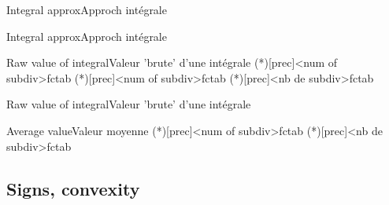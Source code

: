 \documentclass[a4paper,english,11pt]{article}
\begin{document}
\begin{myprestexcode}{Integral approx}{Approch intégrale}

\end{myprestexcode}

\begin{myprestex}{Integral approx}{Approch intégrale}
\end{myprestex}

\begin{myprestexcode}{Raw value of integral}{Valeur 'brute' d'une intégrale}
\pflcalcintegral(*)[prec]<num of subdiv>{fct}{a}{b}
\CalcIntegrale(*)[prec]<num of subdiv>{fct}{a}{b}
\pflvalintegr(*)[prec]<nb de subdiv>{fct}{a}{b}

\end{myprestexcode}

\begin{myprestex}{Raw value of integral}{Valeur 'brute' d'une intégrale}
\end{myprestex}

\begin{myprestexcode}{Average value}{Valeur moyenne}
\pflaveragevalintegral(*)[prec]<num of subdiv>{fct}{a}{b}
\pflvalmoyintegr(*)[prec]<nb de subdiv>{fct}{a}{b}

\end{myprestexcode}

\subsection{Signs, convexity}
\end{document}
